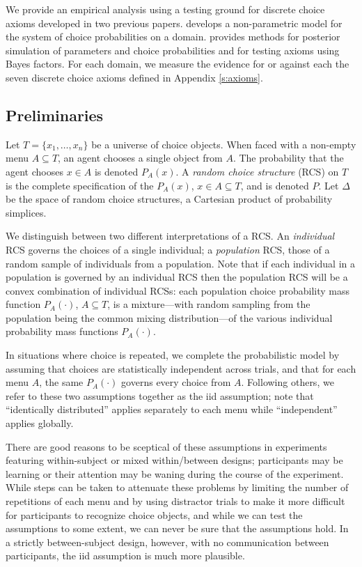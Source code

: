 \documentclass[11pt,letter]{article}
\newcommand{\menu}{menu}
\begin{document}
We provide an empirical analysis using a testing ground for discrete choice axioms developed in two previous papers.
 develops a non-parametric model for the system of choice probabilities on a domain.
 provides methods for posterior simulation of parameters and choice probabilities and for testing axioms using Bayes factors.
For each domain, we measure the evidence for or against each the seven discrete choice axioms defined in Appendix \ref{s:axioms}.

\subsection{Preliminaries}

Let $T = \{x_1,\ldots,x_n\}$ be a universe of choice objects.
When faced with a non-empty \menu{} $A \subseteq T$, an agent chooses a single object from $A$.
The probability that the agent chooses $x \in A$ is denoted $P_A(x)$.
A {\em random choice structure} (RCS) on $T$ is the complete specification of the $P_A(x)$, $x \in A \subseteq T$, and is denoted $P$.
Let $\Delta$ be the space of random choice structures, a Cartesian product of probability simplices.

We distinguish between two different interpretations of a RCS.
An {\em individual} RCS governs the choices of a single individual; a {\em population} RCS, those of a random sample of individuals from a population.
Note that if each individual in a population is governed by an individual RCS then the population RCS will be a convex combination of individual RCSs: each population choice probability mass function $P_A(\cdot)$, $A \subseteq T$, is a mixture---with random sampling from the population being the common mixing distribution---of the various individual probability mass functions $P_A(\cdot)$.

In situations where choice is repeated, we complete the probabilistic model by assuming that choices are statistically independent across trials, and that for each \menu{} $A$, the same $P_A(\cdot)$ governs every choice from $A$.
Following others, we refer to these two assumptions together as the iid assumption; note that ``identically distributed'' applies separately to each \menu{} while ``independent'' applies globally.

There are good reasons to be sceptical of these assumptions in experiments featuring within-subject or mixed within/between designs; participants may be learning or their attention may be waning during the course of the experiment.
While steps can be taken to attenuate these problems by limiting the number of repetitions of each \menu{} and by using distractor trials to make it more difficult for participants to recognize choice objects, and while we can test the assumptions to some extent, we can never be sure that the assumptions hold.
In a strictly between-subject design, however, with no communication between participants, the iid assumption is much more plausible.
\end{document}
